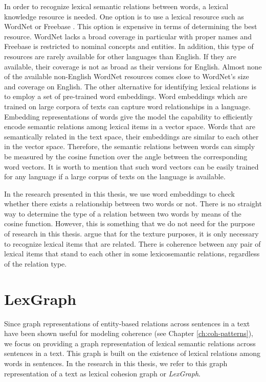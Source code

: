 In order to recognize lexical semantic relations between words, a lexical knowledge resource is needed.   
One option is to use a lexical resource such as WordNet \cite{fellbaum98} or Freebase \cite{bollacker08}.  
This option is expensive in terms of determining the best resource.  
WordNet lacks a broad coverage in particular with proper names and Freebase is restricted to nominal concepts and entities. 
In addition, this type of resources are rarely available for other languages than English.
If they are available, their coverage is not as broad as their versions for English. 
Almost none of the available non-English WordNet resources comes close to WordNet's size and coverage on English. 
The other alternative for identifying lexical relations is to employ a set of pre-trained word embeddings. 
Word embeddings which are trained on large corpora of texts can capture word relationships in a language. 
Embedding representations of words give the model the capability to efficiently encode semantic relations among lexical items in a vector space. 
Words that are semantically related in the text space, their embeddings are similar to each other in the vector space. 
Therefore, the semantic relations between words can simply be measured by the cosine function over the angle between the corresponding word vectors. 
It is worth to mention that such word vectors can be easily trained for any language if a large corpus of texts on the language is available.  

In the research presented in this thesis, we use word embeddings to check whether there exists a relationship between two words or not.  
There is no straight way to determine the type of a relation between two words by means of the cosine function. 
However, this is something that we do not need for the purpose of research in this thesis. 
 argue that for the texture purposes, it is only necessary to recognize lexical items that are related. 
There is coherence between any pair of lexical items that stand to each other in some lexicosemantic relations, regardless of the relation type. 

\section{LexGraph}
\label{sec:lex-graph-representation}

Since graph representations of entity-based relations across sentences in a text have been shown useful for modeling coherence (see Chapter \ref{ch:coh-patterns}), we focus on providing a graph representation of lexical semantic relations across sentences in a text. 
This graph is built on the existence of lexical relations among words in sentences. 
In the research in this thesis, we refer to this graph representation of a text as lexical cohesion graph or \emph{LexGraph}. 

